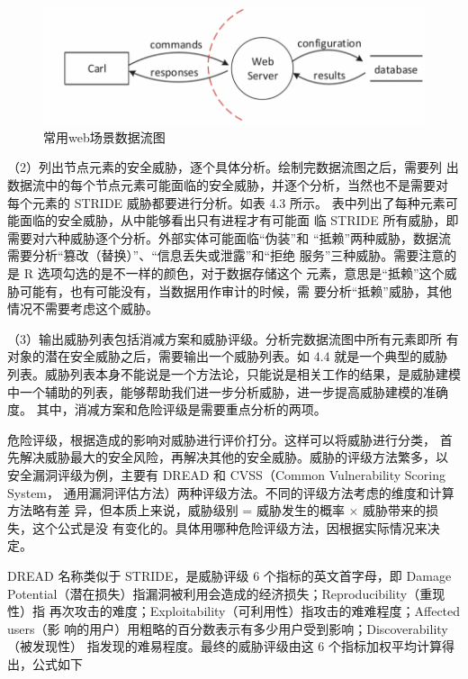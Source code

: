\begin{figure}
    \centering
    \includegraphics[scale=0.6]{resources/img/i7.png}
    \caption{常用web场景数据流图}
  \end{figure}

  （2）列出节点元素的安全威胁，逐个具体分析。绘制完数据流图之后，需要列
  出数据流中的每个节点元素可能面临的安全威胁，并逐个分析，当然也不是需要对
  每个元素的 STRIDE 威胁都要进行分析。如表 4.3 所示。
  表中列出了每种元素可能面临的安全威胁，从中能够看出只有进程才有可能面
  临 STRIDE 所有威胁，即需要对六种威胁逐个分析。外部实体可能面临“伪装”和
  “抵赖”两种威胁，数据流需要分析“篡改（替换）”、“信息丢失或泄露”和“拒绝
  服务”三种威胁。需要注意的是 R 选项勾选的是不一样的颜色，对于数据存储这个
  元素，意思是“抵赖”这个威胁可能有，也有可能没有，当数据用作审计的时候，需
  要分析“抵赖”威胁，其他情况不需要考虑这个威胁。
  
  （3）输出威胁列表包括消减方案和威胁评级。分析完数据流图中所有元素即所
有对象的潜在安全威胁之后，需要输出一个威胁列表。如 4.4 就是一个典型的威胁
列表。威胁列表本身不能说是一个方法论，只能说是相关工作的结果，是威胁建模
中一个辅助的列表，能够帮助我们进一步分析威胁，进一步提高威胁建模的准确度。
其中，消减方案和危险评级是需要重点分析的两项。

危险评级，根据造成的影响对威胁进行评价打分。这样可以将威胁进行分类，
首先解决威胁最大的安全风险，再解决其他的安全威胁。威胁的评级方法繁多，以
安全漏洞评级为例，主要有 DREAD 和 CVSS（Common Vulnerability Scoring System，
通用漏洞评估方法）两种评级方法。不同的评级方法考虑的维度和计算方法略有差
异，但本质上来说，威胁级别 = 威胁发生的概率 × 威胁带来的损失，这个公式是没
有变化的。具体用哪种危险评级方法，因根据实际情况来决定。

DREAD 名称类似于 STRIDE，是威胁评级 6 个指标的英文首字母，即 Damage
Potential（潜在损失）指漏洞被利用会造成的经济损失；Reproducibility（重现性）指
再次攻击的难度；Exploitability（可利用性）指攻击的难难程度；Affected users（影
响的用户）用粗略的百分数表示有多少用户受到影响；Discoverability（被发现性）
指发现的难易程度。最终的威胁评级由这 6 个指标加权平均计算得出，公式如下


